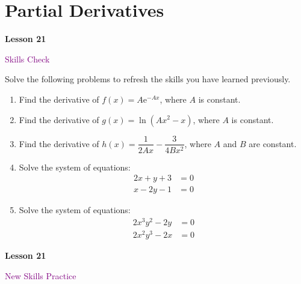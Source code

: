 \documentclass[10pt]{book}
\theoremstyle{definition}
\theoremstyle{remark}
\begin{document}
\section{Partial Derivatives}
\begin{tcolorbox}[
  width=\textwidth,
  colback=gray!10, %
  colframe=white, %
  boxrule=0pt,    %
  left=1cm,       %
  right=1cm,      %
  sharp corners  %
]

\begin{minipage}[t]{0.5\textwidth}
  \Huge \textbf{Lesson 21}
\end{minipage}%
\hfill
\begin{minipage}[t]{0.5\textwidth}
  \Huge \textcolor{purple}{Skills Check}
\end{minipage}
\end{tcolorbox}

\begin{large}
\noindent
Solve the following problems to refresh the skills you have learned previously.
\begin{enumerate}
\item Find the derivative of $f(x) = A\textrm{e}^{-Ax}$, where $A$ is constant.\vfil \vfil \vfil
\item Find the derivative of $g(x) = \ln(Ax^{2} -x)$, where $A$ is constant.\vfil \vfil\vfil
\item Find the derivative of $h(x) = \dfrac{1}{2Ax} - \dfrac{3}{4Bx^{2}}$, where $A$ and $B$ are constant.\vfil \vfil \vfil
\item Solve the system of equations: \begin{align*} 2x+y+3&=0 \\ x-2y-1&=0 \end{align*}\vfil \vfil \vfil
\item Solve the system of equations: \begin{align*} 2x^{3}y^{2}-2y&=0 \\ 2x^{2}y^{3}-2x&=0 \end{align*}\vfil \vfil \vfil
\end{enumerate}
\end{large}
\newpage


\begin{tcolorbox}[
  width=\textwidth,
  colback=gray!10, %
  colframe=white, %
  boxrule=0pt,    %
  left=1cm,       %
  right=1cm,      %
  sharp corners  %
]

\begin{minipage}[t]{0.5\textwidth}
  \Huge \textbf{Lesson 21}
\end{minipage}%
\hfill
\begin{minipage}[t]{0.5\textwidth}
  \Huge\textcolor{purple}{New Skills Practice}
\end{minipage}
\end{tcolorbox}
\end{document}
